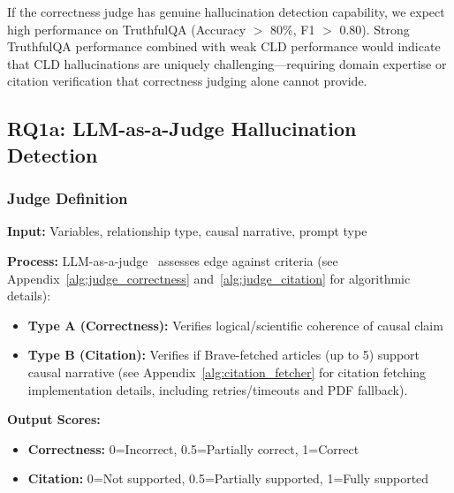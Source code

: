 If the correctness judge has genuine hallucination detection capability, we expect high performance on TruthfulQA (Accuracy $>$ 80\%, F1 $>$ 0.80). Strong TruthfulQA performance combined with weak CLD performance would indicate that CLD hallucinations are uniquely challenging---requiring domain expertise or citation verification that correctness judging alone cannot provide.

\subsection{RQ1a: LLM-as-a-Judge Hallucination Detection}

\subsubsection{Judge Definition}
\textbf{Input:} Variables, relationship type, causal narrative, prompt type

\textbf{Process:} LLM-as-a-judge~\cite{zheng2024llmasajudge} assesses edge against criteria (see Appendix~\ref{alg:judge_correctness} and~\ref{alg:judge_citation} for algorithmic details):
\begin{itemize}[noitemsep]
    \item \textbf{Type A (Correctness):} Verifies logical/scientific coherence of causal claim
    \item \textbf{Type B (Citation):} Verifies if Brave-fetched articles (up to 5) support causal narrative (see Appendix~\ref{alg:citation_fetcher} for citation fetching implementation details, including retries/timeouts and PDF fallback).
\end{itemize}

\textbf{Output Scores:}
\begin{itemize}[noitemsep]
    \item \textbf{Correctness:} 0=Incorrect, 0.5=Partially correct, 1=Correct
    \item \textbf{Citation:} 0=Not supported, 0.5=Partially supported, 1=Fully supported
\end{itemize}

